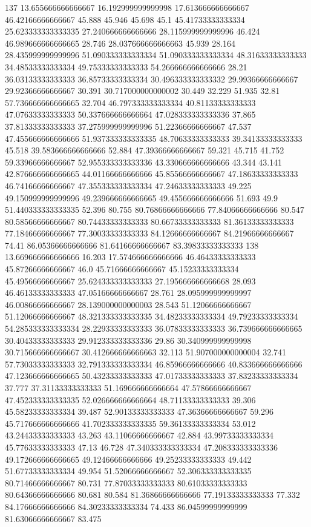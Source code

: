 137 13.655666666666667 16.192999999999998 17.613666666666667 46.42166666666667 45.888 45.946 45.698 45.1 45.41733333333334 25.623333333333335 27.240666666666666 28.115999999999996 46.424 46.989666666666665 28.746 28.037666666666663 45.939 28.164 28.435999999999996 51.090333333333334 51.090333333333334 48.31633333333333 34.48533333333334 49.75333333333333 54.266666666666666 28.21 36.03133333333333 36.85733333333334 30.496333333333332 29.99366666666667 29.92366666666667 30.391 30.717000000000002 30.449 32.229 51.935 32.81 57.736666666666665 32.704 46.797333333333334 40.81133333333333 47.07633333333333 50.337666666666664 47.028333333333336 37.865 37.81333333333333 37.275999999999996 51.22366666666667 47.537 47.455666666666666 51.937333333333335 48.70633333333333 39.34133333333333 45.518 39.583666666666666 52.884 47.39366666666667 59.321 45.715 41.752 59.33966666666667 52.955333333333336 43.330666666666666 43.344 43.141 42.876666666666665 44.01166666666666 45.85566666666667 47.18633333333333 46.74166666666667 47.355333333333334 47.24633333333333 49.225 49.150999999999996 49.239666666666665 49.455666666666666 51.693 49.9 51.440333333333335 52.396 80.755 80.76866666666666 77.84066666666666 80.547 80.58566666666667 80.74433333333333 80.66733333333333 81.36133333333333 77.18466666666667 77.30033333333333 84.12666666666667 84.21966666666667 74.41 86.05366666666666 81.64166666666667 83.39833333333333
138 13.669666666666666 16.203 17.574666666666666 46.46433333333333 45.87266666666667 46.0 45.71666666666667 45.15233333333334 45.49566666666667 25.624333333333333 27.195666666666668 28.093 46.46133333333333 47.05166666666667 28.761 28.095999999999997 46.00866666666667 28.139000000000003 28.543 51.12066666666667 51.12066666666667 48.321333333333335 34.48233333333334 49.79233333333334 54.285333333333334 28.22933333333333 36.07833333333333 36.739666666666665 30.40433333333333 29.912333333333336 29.86 30.340999999999998 30.715666666666667 30.412666666666663 32.113 51.907000000000004 32.741 57.73033333333333 32.791333333333334 46.85966666666666 40.833666666666666 47.123666666666665 50.43233333333333 47.01733333333333 37.83233333333334 37.777 37.31133333333333 51.169666666666664 47.57866666666667 47.452333333333335 52.026666666666664 48.71133333333333 39.306 45.58233333333334 39.487 52.90133333333333 47.36366666666667 59.296 45.717666666666666 41.702333333333335 59.36133333333334 53.012 43.24433333333333 43.263 43.11066666666667 42.884 43.99733333333334 45.77633333333333 47.13 46.728 47.340333333333334 47.208333333333336 49.172666666666665 49.12466666666666 49.25233333333333 49.442 51.67733333333334 49.954 51.52066666666667 52.306333333333335 80.71466666666667 80.731 77.87033333333333 80.61033333333333 80.64366666666666 80.681 80.584 81.36866666666666 77.19133333333333 77.332 84.17666666666666 84.30233333333334 74.433 86.04599999999999 81.63066666666667 83.475
